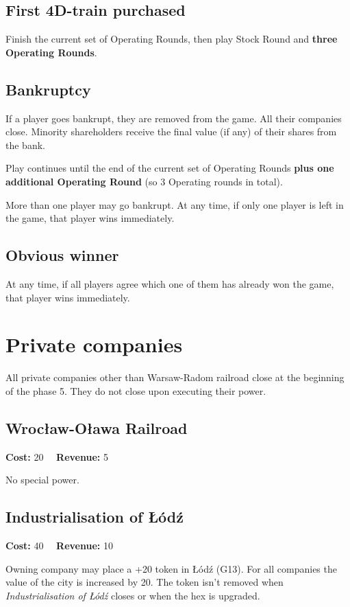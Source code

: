 \documentclass[10pt,a4paper,twocolumn]{article}
\begin{document}
\subsection{First 4D-train purchased}
Finish the current set of Operating Rounds, then play Stock Round and \textbf{three Operating Rounds}.

\subsection{Bankruptcy}
If a player goes bankrupt, they are removed from the game. All their companies close. Minority shareholders receive the final value (if any) of their shares from the bank.

Play continues until the end of the current set of Operating Rounds \textbf{plus one additional Operating Round} (so 3 Operating rounds in total). 

More than one player may go bankrupt. At any time, if only one player is left in the game, that player wins immediately.

\subsection{Obvious winner}
At any time, if all players agree which one of them has already won the game, that player wins immediately.

\section{Private companies}

All private companies other than Warsaw-Radom railroad close at the beginning of the phase 5. They do not close upon executing their power.

\subsection{Wrocław-Oława Railroad}

\textbf{Cost:} 20 ~~\textbf{Revenue:} 5

No special power.

\subsection{Industrialisation of Łódź}

\textbf{Cost:} 40 ~~\textbf{Revenue:} 10

Owning company may place a +20 token in Łódź (G13). For all companies the value of the city is increased by 20. The token isn't removed when \textit{Industrialisation of Łódź} closes or when the hex is upgraded. 
\end{document}
